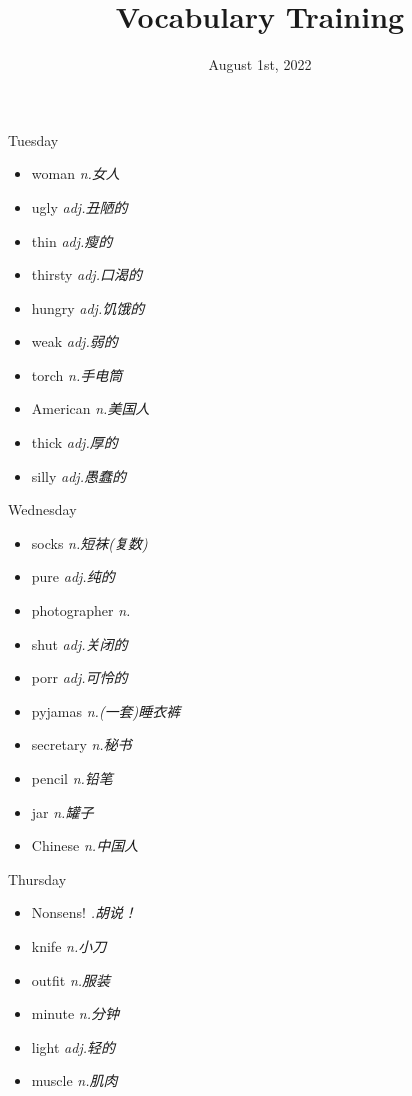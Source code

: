 \documentclass{ctexart}
\title{Vocabulary Training}
\date{August 1st, 2022}
\begin{document}
\maketitle
\begin{multicols}{2}
\begin{textbox}{Tuesday}
\begin{itemize}
\item woman \emph{n.女人}
\item ugly \emph{adj.丑陋的}
\item thin \emph{adj.瘦的}
\item thirsty \emph{adj.口渴的}
\item hungry \emph{adj.饥饿的}
\item weak \emph{adj.弱的}
\item torch \emph{n.手电筒}
\item American \emph{n.美国人}
\item thick \emph{adj.厚的}
\item silly \emph{adj.愚蠢的}
\end{itemize}
\end{textbox}
\begin{textbox}{Wednesday}
\begin{itemize}
\item socks \emph{n.短袜(复数)}
\item pure \emph{adj.纯的}
\item photographer \emph{n.}
\item shut \emph{adj.关闭的}
\item porr \emph{adj.可怜的}
\item pyjamas \emph{n.(一套)睡衣裤}
\item secretary \emph{n.秘书}
\item pencil \emph{n.铅笔}
\item jar \emph{n.罐子}
\item Chinese \emph{n.中国人}
\end{itemize}
\end{textbox}
\begin{textbox}{Thursday}
\begin{itemize}
\item Nonsens! \emph{.胡说！}
\item knife \emph{n.小刀}
\item outfit \emph{n.服装}
\item minute \emph{n.分钟}
\item light \emph{adj.轻的}
\item muscle \emph{n.肌肉}

\end{itemize}
\end{textbox}
\end{multicols}
\end{document}
